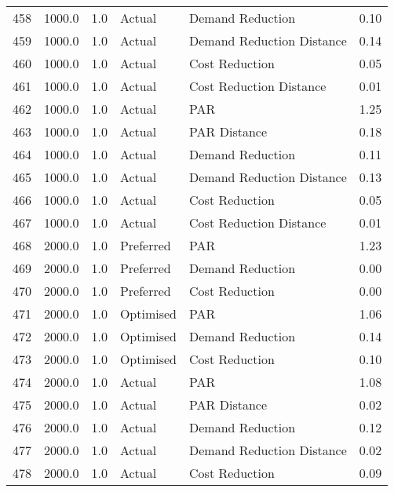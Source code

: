 \begin{longtable}{lrrllr}
458  &       1000.0 &     1.0 &         Actual &           Demand Reduction &   0.10 \\
459  &       1000.0 &     1.0 &         Actual &  Demand Reduction Distance &   0.14 \\
460  &       1000.0 &     1.0 &         Actual &             Cost Reduction &   0.05 \\
461  &       1000.0 &     1.0 &         Actual &    Cost Reduction Distance &   0.01 \\
462  &       1000.0 &     1.0 &         Actual &                        PAR &   1.25 \\
463  &       1000.0 &     1.0 &         Actual &               PAR Distance &   0.18 \\
464  &       1000.0 &     1.0 &         Actual &           Demand Reduction &   0.11 \\
465  &       1000.0 &     1.0 &         Actual &  Demand Reduction Distance &   0.13 \\
466  &       1000.0 &     1.0 &         Actual &             Cost Reduction &   0.05 \\
467  &       1000.0 &     1.0 &         Actual &    Cost Reduction Distance &   0.01 \\
468  &       2000.0 &     1.0 &      Preferred &                        PAR &   1.23 \\
469  &       2000.0 &     1.0 &      Preferred &           Demand Reduction &   0.00 \\
470  &       2000.0 &     1.0 &      Preferred &             Cost Reduction &   0.00 \\
471  &       2000.0 &     1.0 &      Optimised &                        PAR &   1.06 \\
472  &       2000.0 &     1.0 &      Optimised &           Demand Reduction &   0.14 \\
473  &       2000.0 &     1.0 &      Optimised &             Cost Reduction &   0.10 \\
474  &       2000.0 &     1.0 &         Actual &                        PAR &   1.08 \\
475  &       2000.0 &     1.0 &         Actual &               PAR Distance &   0.02 \\
476  &       2000.0 &     1.0 &         Actual &           Demand Reduction &   0.12 \\
477  &       2000.0 &     1.0 &         Actual &  Demand Reduction Distance &   0.02 \\
478  &       2000.0 &     1.0 &         Actual &             Cost Reduction &   0.09 \\

\end{longtable}
